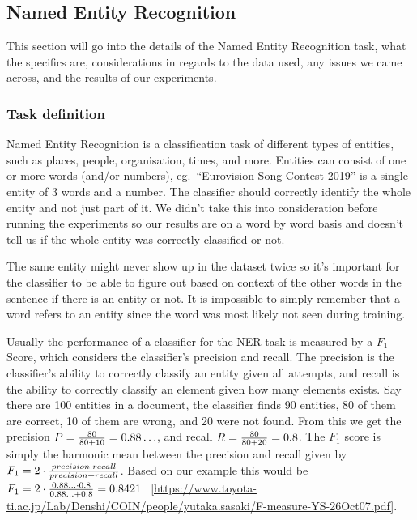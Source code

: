 
\subsection{Named Entity Recognition}

This section will go into the details of the Named Entity Recognition task, what
the specifics are, considerations in regards to the data used, any issues we
came across, and the results of our experiments.

\subsubsection{Task definition}

Named Entity Recognition is a classification task of different types of
entities, such as places, people, organisation, times, and more. Entities can
consist of one or more words (and/or numbers), eg.\ ``Eurovision Song Contest
2019'' is a single entity of 3 words and a number. The classifier should
correctly identify the whole entity and not just part of it. We didn't take this
into consideration before running the experiments so our results are on a word
by word basis and doesn't tell us if the whole entity was correctly classified
or not.

The same entity might never show up in the dataset twice so it's important for
the classifier to be able to figure out based on context of the other words in
the sentence if there is an entity or not. It is impossible to simply remember
that a word refers to an entity since the word was most likely not seen during
training.

Usually the performance of a classifier for the NER task is measured by a $F_1$
Score, which considers the classifier's precision and recall. The precision is
the classifier's ability to correctly classify an entity given all attempts, and
recall is the ability to correctly classify an element given how many elements
exists. Say there are 100 entities in a document, the classifier finds 90
entities, 80 of them are correct, 10 of them are wrong, and 20 were not found.
From this we get the precision $P = {80 \over 80 + 10} = 0.88\ldots$, and recall
$R = {80 \over 80 + 20} = 0.8$. The $F_1$ score is simply the harmonic mean
between the precision and recall given by $F_1 = 2 \cdot {precision \cdot recall
\over precision + recall}$. Based on our example this would be $F_1 = 2 \cdot
{0.88 \ldots \cdot 0.8 \over 0.88\ldots + 0.8} = 0.8421$
~\ref{https://www.toyota-ti.ac.jp/Lab/Denshi/COIN/people/yutaka.sasaki/F-measure-YS-26Oct07.pdf}.


